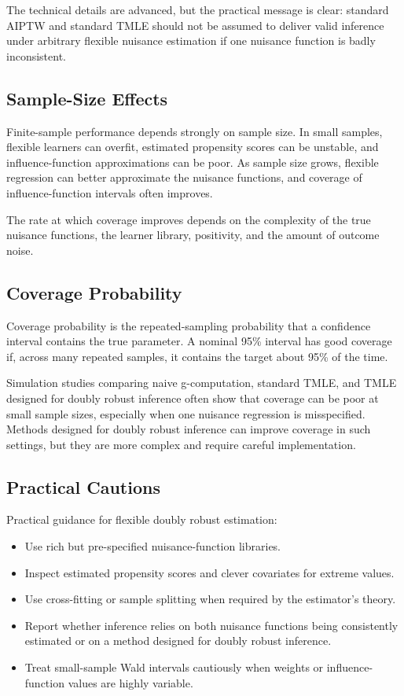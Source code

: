The technical details are advanced, but the practical message is clear: standard AIPTW
and standard TMLE should not be assumed to deliver valid inference under arbitrary
flexible nuisance estimation if one nuisance function is badly inconsistent.

\subsection{Sample-Size Effects}

Finite-sample performance depends strongly on sample size. In small samples,
flexible learners can overfit, estimated propensity scores can be unstable, and
influence-function approximations can be poor. As sample size grows, flexible
regression can better approximate the nuisance functions, and coverage of
influence-function intervals often improves.

The rate at which coverage improves depends on the complexity of the true nuisance
functions, the learner library, positivity, and the amount of outcome noise.

\subsection{Coverage Probability}

Coverage probability is the repeated-sampling probability that a confidence interval
contains the true parameter. A nominal 95\% interval has good coverage if, across many
repeated samples, it contains the target about 95\% of the time.

Simulation studies comparing naive g-computation, standard TMLE, and TMLE designed
for doubly robust inference often show that coverage can be poor at small sample
sizes, especially when one nuisance regression is misspecified. Methods designed for
doubly robust inference can improve coverage in such settings, but they are more
complex and require careful implementation.

\subsection{Practical Cautions}

\begin{estimationbox}
Practical guidance for flexible doubly robust estimation:
\begin{itemize}
\item Use rich but pre-specified nuisance-function libraries.
\item Inspect estimated propensity scores and clever covariates for extreme values.
\item Use cross-fitting or sample splitting when required by the estimator's theory.
\item Report whether inference relies on both nuisance functions being consistently
estimated or on a method designed for doubly robust inference.
\item Treat small-sample Wald intervals cautiously when weights or influence-function
values are highly variable.
\end{itemize}
\end{estimationbox}

